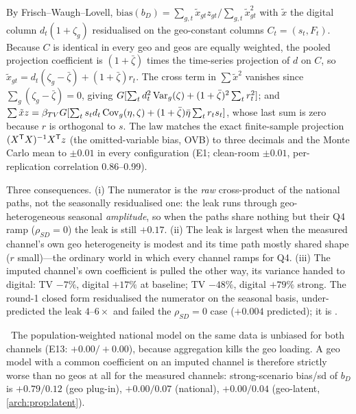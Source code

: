 By Frisch--Waugh--Lovell, $\mathrm{bias}(b_D) = \sum_{g,t}\tilde x_{gt}z_{gt}/\sum_{g,t}\tilde x_{gt}^2$ with $\tilde x$ the digital column $d_t(1+\zeta_g)$ residualised on the geo-constant columns $C_t = (s_t, F_t)$. Because $C$ is identical in every geo and geos are equally weighted, the pooled projection coefficient is $(1+\bar\zeta)$ times the time-series projection of $d$ on $C$, so $\tilde x_{gt} = d_t(\zeta_g-\bar\zeta) + (1+\bar\zeta)r_t$. The cross term in $\sum\tilde x^2$ vanishes since $\sum_g(\zeta_g-\bar\zeta) = 0$, giving $G[\sum_t d_t^2\operatorname{Var}_g(\zeta) + (1+\bar\zeta)^2\sum_t r_t^2]$; and $\sum\tilde xz = \beta_{TV}G[\sum_t s_td_t\operatorname{Cov}_g(\eta,\zeta) + (1+\bar\zeta)\bar\eta\sum_t r_ts_t]$, whose last sum is zero because $r$ is orthogonal to $s$. The law matches the exact finite-sample projection $(X^{\mathsf{T}} X)^{-1}X^{\mathsf{T}} z$ (the omitted-variable bias, OVB) to three decimals and the Monte Carlo mean to $\pm0.01$ in every configuration (E1; clean-room $\pm0.01$, per-replication correlation 0.86--0.99).

Three consequences. (i) The numerator is the \emph{raw} cross-product of the national paths, not the seasonally residualised one: the leak runs through geo-heterogeneous seasonal \emph{amplitude}, so when the paths share nothing but their Q4 ramp ($\rho_{SD} = 0$) the leak is still $+0.17$. (ii) The leak is largest when the measured channel's own geo heterogeneity is modest and its time path mostly shared shape ($r$ small)---the ordinary world in which every channel ramps for Q4. (iii) The imputed channel's own coefficient is pulled the other way, its variance handed to digital: TV $-7\%$, digital $+17\%$ at baseline; TV $-48\%$, digital $+79\%$ strong. The round-1 closed form residualised the numerator on the seasonal basis, under-predicted the leak $4$--$6\times$ and failed the $\rho_{SD} = 0$ case ($+0.004$ predicted); it is \tagRefuted.

\begin{corollary}
\label{arch:cor:manufacture}
\tagNumerical\ The population-weighted national model on the same data is unbiased for both channels (E13: $+0.00/+0.00$), because aggregation kills the geo loading. A geo model with a common coefficient on an imputed channel is therefore strictly worse than no geos at all for the measured channels: strong-scenario bias/sd of $b_D$ is $+0.79/0.12$ (geo plug-in), $+0.00/0.07$ (national), $+0.00/0.04$ (geo-latent, \cref{arch:prop:latent}).
\end{corollary}

